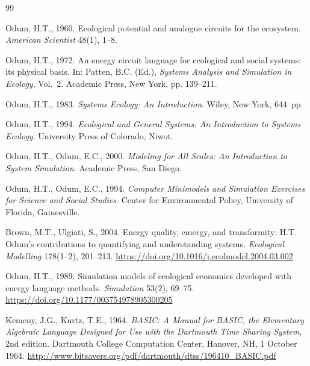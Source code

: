 \begin{thebibliography}{99}

Odum, H.T., 1960. Ecological potential and analogue circuits for the ecosystem. \emph{American Scientist} 48(1), 1--8.

Odum, H.T., 1972. An energy circuit language for ecological and social systems: its physical basis. In: Patten, B.C. (Ed.), \emph{Systems Analysis and Simulation in Ecology}, Vol.~2. Academic Press, New York, pp. 139--211.

Odum, H.T., 1983. \emph{Systems Ecology: An Introduction}. Wiley, New York, 644~pp.

Odum, H.T., 1994. \emph{Ecological and General Systems: An Introduction to Systems Ecology}. University Press of Colorado, Niwot.

Odum, H.T., Odum, E.C., 2000. \emph{Modeling for All Scales: An Introduction to System Simulation}. Academic Press, San Diego.

Odum, H.T., Odum, E.C., 1994. \emph{Computer Minimodels and Simulation Exercises for Science and Social Studies}. Center for Environmental Policy, University of Florida, Gainesville.

Brown, M.T., Ulgiati, S., 2004. Energy quality, emergy, and transformity: H.T. Odum's contributions to quantifying and understanding systems. \emph{Ecological Modelling} 178(1--2), 201--213. \url{https://doi.org/10.1016/j.ecolmodel.2004.03.002}

Odum, H.T., 1989. Simulation models of ecological economics developed with energy language methods. \emph{Simulation} 53(2), 69--75. \url{https://doi.org/10.1177/003754978905300205}

Kemeny, J.G., Kurtz, T.E., 1964. \emph{BASIC: A Manual for BASIC, the Elementary Algebraic Language Designed for Use with the Dartmouth Time Sharing System}, 2nd edition. Dartmouth College Computation Center, Hanover, NH, 1 October 1964. \url{http://www.bitsavers.org/pdf/dartmouth/dtss/196410_BASIC.pdf}


\end{thebibliography}
